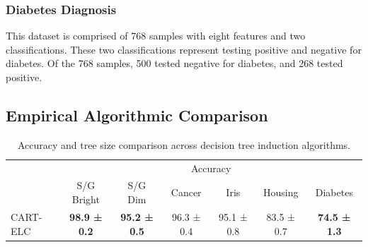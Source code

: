 \documentclass[10pt]{article} %
\begin{document}
\subsubsection{Diabetes Diagnosis}\label{diabetes}

This dataset \citep{diabetes} is comprised of 768 samples with eight features and two classifications. These two classifications represent testing positive and negative for diabetes. Of the 768 samples, 500 tested negative for diabetes, and 268 tested positive.


\newpage
\subsection{Empirical Algorithmic Comparison}\label{empirical_comparison}

\begin{table}[h]
	\centering
	\small
    \caption{Accuracy and tree size comparison across decision tree induction algorithms.}
	\begin{tabular}{lcccccc} 
		\addlinespace
		\toprule
		\multirow{2}{*}{Algorithm} & \multicolumn{6}{c}{Accuracy}  \\ 
		\cmidrule(lr){2-7}  
		& S/G Bright & S/G Dim & Cancer & Iris & Housing & Diabetes \\ 
		\midrule
		CART-ELC  & \textbf{98.9 ± 0.2} & \textbf{95.2 ± 0.5} & 96.3 ± 0.4 & 95.1 ± 0.8 & 83.5 ± 0.7 & \textbf{74.5 ± 1.3}  \\


\end{tabular}
\end{table}
\end{document}
